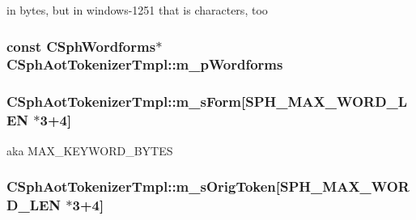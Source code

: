 in bytes, but in windows-\/1251 that is characters, too 

\hypertarget{classCSphAotTokenizerTmpl_a11d6d02186f62c29aff635f7e7c19a1d}{
\subsubsection[{m\-\_\-p\-Wordforms}]{\setlength{\rightskip}{0pt plus 5cm}const {\bf C\-Sph\-Wordforms}$\ast$ C\-Sph\-Aot\-Tokenizer\-Tmpl\-::m\-\_\-p\-Wordforms\hspace{0.3cm}{\ttfamily [protected]}}}\label{classCSphAotTokenizerTmpl_a11d6d02186f62c29aff635f7e7c19a1d}
\hypertarget{classCSphAotTokenizerTmpl_ac35cfe3d9fd0f9800e672931235d0190}{
\subsubsection[{m\-\_\-s\-Form}]{ C\-Sph\-Aot\-Tokenizer\-Tmpl\-::m\-\_\-s\-Form\mbox{[}{\bf S\-P\-H\-\_\-\-M\-A\-X\-\_\-\-W\-O\-R\-D\-\_\-\-L\-E\-N} $\ast$3+4\mbox{]}\hspace{0.3cm}{\ttfamily [protected]}}}\label{classCSphAotTokenizerTmpl_ac35cfe3d9fd0f9800e672931235d0190}


aka M\-A\-X\-\_\-\-K\-E\-Y\-W\-O\-R\-D\-\_\-\-B\-Y\-T\-E\-S 

\hypertarget{classCSphAotTokenizerTmpl_a2cae76380b2d69ef981785ae74e439ac}{
\subsubsection[{m\-\_\-s\-Orig\-Token}]{ C\-Sph\-Aot\-Tokenizer\-Tmpl\-::m\-\_\-s\-Orig\-Token\mbox{[}{\bf S\-P\-H\-\_\-\-M\-A\-X\-\_\-\-W\-O\-R\-D\-\_\-\-L\-E\-N} $\ast$3+4\mbox{]}\hspace{0.3cm}{\ttfamily [protected]}}}\label{classCSphAotTokenizerTmpl_a2cae76380b2d69ef981785ae74e439ac}


